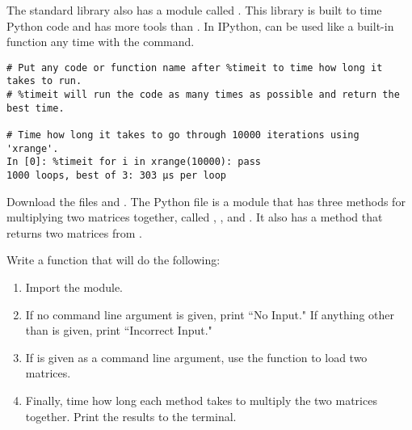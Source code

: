 The standard library also has a module called .
This library is built to time Python code and has more tools than 
.
In IPython,  can be used like a built-in function any time with the  command.

\begin{lstlisting}
# Put any code or function name after %timeit to time how long it takes to run.
# %timeit will run the code as many times as possible and return the best time.

# Time how long it takes to go through 10000 iterations using 'xrange'.
In [0]: %timeit for i in xrange(10000): pass 
1000 loops, best of 3: 303 µs per loop
\end{lstlisting}

\begin{problem}
Download the files  and .
The Python file  is a module that has three methods for multiplying two matrices together, called , , and .
It also has a  method that returns two matrices from .

Write a function that will do the following:
\begin{enumerate}
\item Import the  module.
\item If no command line argument is given, print ``No Input."  If anything other than  is given, print ``Incorrect Input."
\item If  is given as a command line argument, use the  function to load two matrices.
\item Finally, time how long each method takes to multiply the two matrices together. Print the results to the terminal.
\end{enumerate}
\end{problem}
